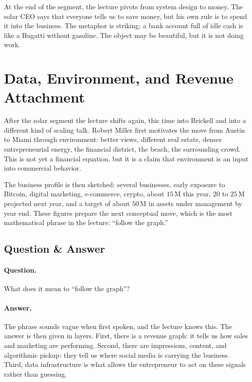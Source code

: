 At the end of the segment, the lecture pivots from system design to money. The solar CEO says that everyone tells us to save money, but his own rule is to spend it into the business. The metaphor is striking: a bank account full of idle cash is like a Bugatti without gasoline. The object may be beautiful, but it is not doing work.

\section{Data, Environment, and Revenue Attachment}

After the solar segment the lecture shifts again, this time into Brickell and into a different kind of scaling talk. Robert Miller first motivates the move from Austin to Miami through environment: better views, different real estate, denser entrepreneurial energy, the financial district, the beach, the surrounding crowd. This is not yet a financial equation, but it is a claim that environment is an input into commercial behavior.

The business profile is then sketched: several businesses, early exposure to Bitcoin, digital marketing, e-commerce, crypto, about \(15\,\mathrm{M}\) this year, \(20\) to \(25\,\mathrm{M}\) projected next year, and a target of about \(50\,\mathrm{M}\) in assets under management by year end. These figures prepare the next conceptual move, which is the most mathematical phrase in the lecture: ``follow the graph.''

\subsection{Question \& Answer}

\paragraph{Question.}
What does it mean to ``follow the graph''?

\paragraph{Answer.}
The phrase sounds vague when first spoken, and the lecture knows this. The answer is then given in layers. First, there is a revenue graph: it tells us how sales and marketing are performing. Second, there are impressions, content, and algorithmic pickup: they tell us where social media is carrying the business. Third, data infrastructure is what allows the entrepreneur to act on these signals rather than guessing.

